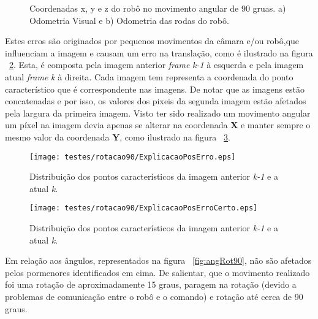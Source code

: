 \begin{figure}[h!]
	\centering
	\qquad
	\caption{Coordenadas x, y e z do robô  no movimento angular de 90 gruas. a) Odometria Visual e b) Odometria das rodas do robô.}
	\label{fig:posRot90}
\end{figure}


Estes erros são originados por pequenos movimentos da câmara e/ou robô,que influenciam a imagem e causam um erro na translação, como é ilustrado na figura ~\ref{fig:ExplicPosErr}. Esta, é composta pela imagem anterior \textit{frame} \textit{k-1} à esquerda e pela imagem atual \textit{frame} \textit{k} à direita. Cada imagem tem representa a coordenada do ponto característico que é correspondente nas imagens. De notar que as imagens estão concatenadas e por isso, os valores dos pixeis da segunda imagem estão afetados pela largura da primeira imagem. Visto ter sido realizado um movimento angular um píxel na imagem devia apenas se alterar na coordenada \textbf{X} e manter sempre o mesmo valor da coordenada \textbf{Y}, como ilustrado na figura ~\ref{fig:ExplicPosErrCerto}.



\begin{figure}[h!]
	\begin{center}
		\leavevmode		
		\texttt{[image: testes/rotacao90/ExplicacaoPosErro.eps]}
		\caption{Distribuição dos pontos característicos da imagem anterior \textit{k-1} e a atual \textit{k}.}
		\label{fig:ExplicPosErr}
	\end{center}
\end{figure}


\begin{figure}[h!]
	\begin{center}
		\leavevmode		
		\texttt{[image: testes/rotacao90/ExplicacaoPosErroCerto.eps]}
		\caption{Distribuição dos pontos característicos da imagem anterior \textit{k-1} e a atual \textit{k}.}
		\label{fig:ExplicPosErrCerto}
	\end{center}
\end{figure}


Em relação aos ângulos, representados na figura ~\ref{fig:angRot90}, não são afetados pelos pormenores identificados em cima. De salientar, que o movimento realizado foi uma rotação de aproximadamente 15 graus, paragem na rotação (devido a problemas de comunicação entre o robô e o comando) e rotação até cerca de 90 graus. 


